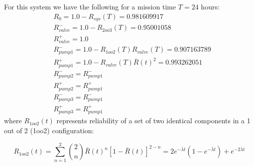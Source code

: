 For this system we have the following for a mission time $T=24$ hours:
\begin{align} 
  & R_0         = 1.0 - R_{sys}(T) = 0.981609917 \\
  & R_{valve}^- = 1.0 - R_{2oo3}(T) = 0.95001058 \\
  & R_{valve}^+ = 1.0 \\
  & R_{pump1}^- = 1.0 - R_{1oo2}(T) R_{valve}(T) = 0.907163789\\
  & R_{pump1}^+ = 1.0 - R_{valve}(T) \bar{R}(t)^2 = 0.993262051\\
  & R_{pump2}^- = R_{pump1}^- \\
  & R_{pump2}^+ = R_{pump1}^+ \\
  & R_{pump3}^- = R_{pump1}^- \\
  & R_{pump3}^+ = R_{pump1}^+ 
\end{align}
where $R_{1oo2}(t)$ represents reliability of a set of two identical components 
in a 1 out of 2 (1oo2) configuration:

\begin{equation}
  R_{1oo2}(t) = \sum\limits_{n=1}^2 \binom{2}{n} \bar{R}(t)^n [1-\bar{R}(t)]^{2-n}
              = 2 e^{- \bar{\lambda} t} (1 - e^{- \bar{\lambda} t}) + e^{- 2 \bar{\lambda} t}
\end{equation}
